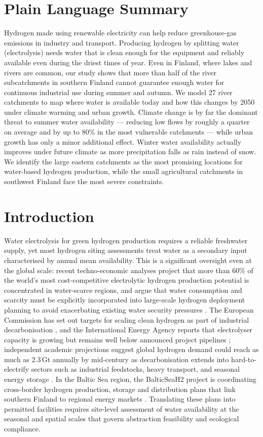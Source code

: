 \documentclass[draft]{agujournal2019}
\begin{document}
\section*{Plain Language Summary}
Hydrogen made using renewable electricity can help reduce greenhouse-gas emissions in industry and transport. Producing hydrogen by splitting water (electrolysis) needs water that is clean enough for the equipment and reliably available even during the driest times of year. Even in Finland, where lakes and rivers are common, our study shows that more than half of the river subcatchments in southern Finland cannot guarantee enough water for continuous industrial use during summer and autumn. We model 27 river catchments to map where water is available today and how this changes by 2050 under climate warming and urban growth. Climate change is by far the dominant threat to summer water availability — reducing low flows by roughly a quarter on average and by up to 80\% in the most vulnerable catchments — while urban growth has only a minor additional effect. Winter water availability actually improves under future climate as more precipitation falls as rain instead of snow. We identify the large eastern catchments as the most promising locations for water-based hydrogen production, while the small agricultural catchments in southwest Finland face the most severe constraints.

\section{Introduction}

Water electrolysis for green hydrogen production requires a reliable freshwater supply, yet most hydrogen siting assessments treat water as a secondary input characterised by annual mean availability. This is a significant oversight even at the global scale: recent techno-economic analyses project that more than 60\% of the world's most cost-competitive electrolytic hydrogen production potential is concentrated in water-scarce regions, and argue that water consumption and scarcity must be explicitly incorporated into large-scale hydrogen deployment planning to avoid exacerbating existing water security pressures \cite{Terlouw2024}. The European Commission has set out targets for scaling clean hydrogen as part of industrial decarbonisation \cite{EuropeanCommission2020HydrogenStrategy}, and the International Energy Agency reports that electrolyser capacity is growing but remains well below announced project pipelines \cite{IEA2024GlobalHydrogenReview}; independent academic projections suggest global hydrogen demand could reach as much as 2.3\,Gt annually by mid-century as decarbonisation extends into hard-to-electrify sectors such as industrial feedstocks, heavy transport, and seasonal energy storage \cite{OliveiraBeswickYan2021}. In the Baltic Sea region, the BalticSeaH2 project is coordinating cross-border hydrogen production, storage and distribution plans that link southern Finland to regional energy markets \cite{EuropeanCommission_BalticSeaH2_2023}. Translating these plans into permitted facilities requires site-level assessment of water availability at the seasonal and spatial scales that govern abstraction feasibility and ecological compliance.
\end{document}
